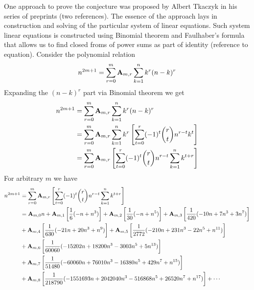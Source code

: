 One approach to prove the conjecture was proposed by Albert Tkaczyk in his series of preprints (two references).
The essence of the approach lays in construction and solving of the particular system of linear equations.
Such system linear equations is constructed using Binomial theorem and Faulhaber's formula
that allows us to find closed froms of power sums as part of identity (reference to equation).
Consider the polynomial relation
\begin{equation}
    n^{2m+1} = \sum_{r=0}^{m} {\mathbf{A}} \sb{m,r} \sum_{k=1}^{n} k^{r} (n-k)^{r}\label{eq:odd-power-identity}
\end{equation}
Expanding the $(n-k)^r$ part via Binomial theorem we get
\begin{equation}
    \begin{split}
        n^{2m+1} &= \sum_{r=0}^{m} {\mathbf{A}} \sb{m,r} \sum_{k=1}^{n} k^{r} (n-k)^{r} \\
        &= \sum_{r=0}^{m} {\mathbf{A}} \sb{m,r} \sum_{k=1}^{n} k^{r} \left[ \sum_{t=0}^{r} (-1)^t \binom{r}{t} n^{r-t} k^{t} \right] \\
        &= \sum_{r=0}^{m} {\mathbf{A}} \sb{m,r} \left[ \sum_{t=0}^{r} (-1)^t \binom{r}{t} n^{r-t} \sum_{k=1}^{n} k^{t+r} \right] \\
    \end{split}\label{eq:equation2}
\end{equation}
For arbitrary $m$ we have
\begin{equation}
    \begin{split}
        n^{2m+1}
        &= \sum_{r=0}^{m} {\mathbf{A}} \sb{m,r} \left[ \sum_{t=0}^{r} (-1)^t \binom{r}{t} n^{r-t} \sum_{k=1}^{n} k^{t+r} \right] \\
        &= {\mathbf{A}} \sb{m,0} n
        + {\mathbf{A}} \sb{m,1} \left[ \frac{1}{6} (-n + n^3) \right]
        + {\mathbf{A}} \sb{m,2} \left[ \frac{1}{30} (-n + n^5) \right]
        + {\mathbf{A}} \sb{m,3} \left[ \frac{1}{420} (-10 n + 7 n^3 + 3 n^7) \right] \\
        &+ {\mathbf{A}} \sb{m,4} \left[ \frac{1}{630} (-21 n + 20 n^3 + n^9) \right]
        + {\mathbf{A}} \sb{m,5} \left[ \frac{1}{2772} (-210 n + 231 n^3 - 22 n^5 + n^{11}) \right] \\
        &+ {\mathbf{A}} \sb{m,6} \left[ \frac{1}{60060} (-15202 n + 18200 n^3 - 3003 n^5 + 5 n^{13}) \right] \\
        &+ {\mathbf{A}} \sb{m,7} \left[ \frac{1}{51480} (-60060 n + 76010 n^3 - 16380 n^5 + 429 n^7 + n^{15}) \right] \\
        &+ {\mathbf{A}} \sb{m,8} \left[ \frac{1}{218790} (-1551693 n + 2042040 n^3 - 516868 n^5 + 26520 n^7 + n^{17}) \right] + \cdots
    \end{split}\label{eq:equation17}
\end{equation}
